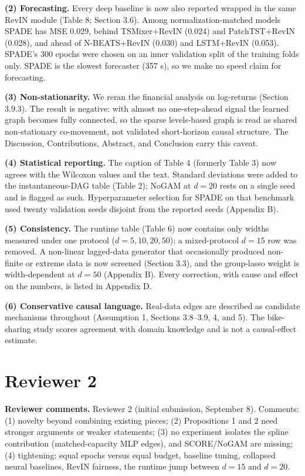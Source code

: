 \documentclass[11pt]{article}
\begin{document}
\textbf{(2) Forecasting.} Every deep baseline is now also reported wrapped in the same RevIN module (Table 8; Section 3.6). Among normalization-matched models SPADE has MSE 0.029, behind TSMixer+RevIN (0.024) and PatchTST+RevIN (0.028), and ahead of N-BEATS+RevIN (0.030) and LSTM+RevIN (0.053). SPADE's 300 epochs were chosen on an inner validation split of the training folds only. SPADE is the slowest forecaster (357 s), so we make no speed claim for forecasting.

\textbf{(3) Non-stationarity.} We reran the financial analysis on log-returns (Section 3.9.3). The result is negative: with almost no one-step-ahead signal the learned graph becomes fully connected, so the sparse levels-based graph is read as shared non-stationary co-movement, not validated short-horizon causal structure. The Discussion, Contributions, Abstract, and Conclusion carry this caveat.

\textbf{(4) Statistical reporting.} The caption of Table 4 (formerly Table 3) now agrees with the Wilcoxon values and the text. Standard deviations were added to the instantaneous-DAG table (Table 2); NoGAM at $d=20$ rests on a single seed and is flagged as such. Hyperparameter selection for SPADE on that benchmark used twenty validation seeds disjoint from the reported seeds (Appendix B).

\textbf{(5) Consistency.} The runtime table (Table 6) now contains only widths measured under one protocol ($d = 5, 10, 20, 50$); a mixed-protocol $d = 15$ row was removed. A non-linear lagged-data generator that occasionally produced non-finite or extreme data is now screened (Section 3.3), and the group-lasso weight is width-dependent at $d = 50$ (Appendix B). Every correction, with cause and effect on the numbers, is listed in Appendix D.

\textbf{(6) Conservative causal language.} Real-data edges are described as candidate mechanisms throughout (Assumption 1, Sections 3.8--3.9, 4, and 5). The bike-sharing study scores agreement with domain knowledge and is not a causal-effect estimate.

\section*{Reviewer 2}
\textbf{Reviewer comments.} Reviewer 2 (initial submission, September 8). Comments: (1) novelty beyond combining existing pieces; (2) Propositions 1 and 2 need stronger arguments or weaker statements; (3) no experiment isolates the spline contribution (matched-capacity MLP edges), and SCORE/NoGAM are missing; (4) tightening: equal epochs versus equal budget, baseline tuning, collapsed neural baselines, RevIN fairness, the runtime jump between $d=15$ and $d=20$.
\end{document}
